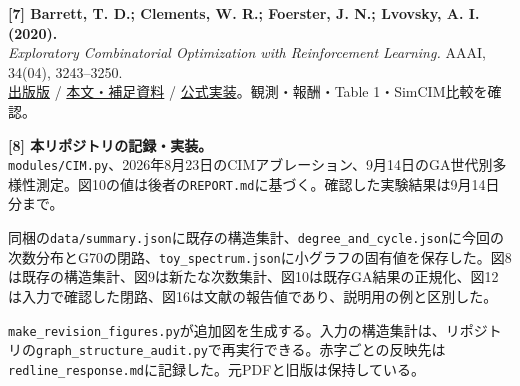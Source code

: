 \documentclass[a4paper,11pt]{ltjsarticle}
\newcommand{\sub}[1]{\par\vspace{2mm}\noindent{\sffamily\bfseries\large\color{navy}#1}\par}
\begin{document}
{\noindent\textbf{[7] Barrett, T. D.; Clements, W. R.; Foerster, J. N.; Lvovsky, A. I. (2020).}\\
\textit{Exploratory Combinatorial Optimization with Reinforcement Learning.} AAAI, 34(04), 3243--3250.\\
\href{https://ojs.aaai.org/index.php/AAAI/article/view/5723}{出版版} / \href{https://arxiv.org/abs/1909.04063}{本文・補足資料} / \href{https://github.com/tomdbar/eco-dqn}{公式実装}。観測・報酬・Table 1・SimCIM比較を確認。

\noindent\textbf{[8] 本リポジトリの記録・実装。}\\
\texttt{modules/CIM.py}、2026年8月23日のCIMアブレーション、9月14日のGA世代別多様性測定。図10の値は後者の\texttt{REPORT.md}に基づく。確認した実験結果は9月14日分まで。
}
\sub{追加図と集計の再現}
{\small
同梱の\texttt{data/summary.json}に既存の構造集計、\texttt{degree\_and\_cycle.json}に今回の次数分布とG70の閉路、\texttt{toy\_spectrum.json}に小グラフの固有値を保存した。図8は既存の構造集計、図9は新たな次数集計、図10は既存GA結果の正規化、図12は入力で確認した閉路、図16は文献の報告値であり、説明用の例と区別した。

\texttt{make\_revision\_figures.py}が追加図を生成する。入力の構造集計は、リポジトリの\texttt{graph\_structure\_audit.py}で再実行できる。赤字ごとの反映先は\texttt{redline\_response.md}に記録した。元PDFと旧版は保持している。
}
\end{document}
